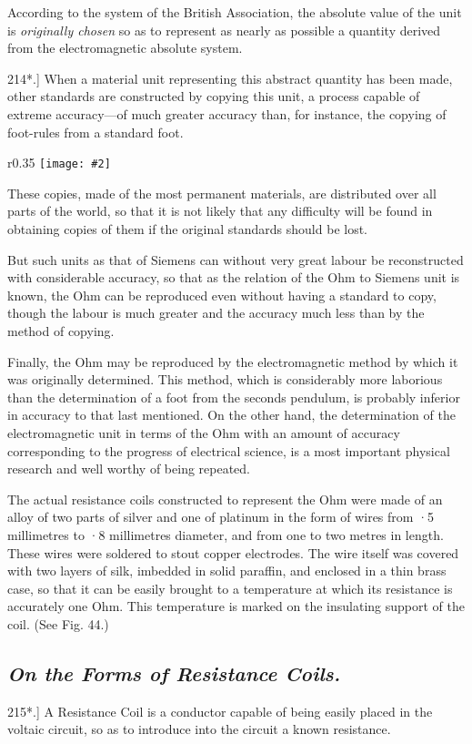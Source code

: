 \documentclass[12pt,oneside]{book}[2021/10/04]
\newcommand{\Heading}{\centering\normalfont}
\newcommand{\Subsection}[1]{\subsection*{\normalsize\Heading\itshape #1}}
\newcommand{\Runhead}[1]{\fancyhead[C]{\iffloatpage{}{\small#1}}}
\newcommand{\article}[1]{\phantomsection \label{art:#1}{#1.]}}
\newcommand{\wrapfig}[3]{
\begin{wrapfigure}{r}{#1\textwidth}
\centering
\texttt{[image: \#2]}
\caption*{\small #3}
\end{wrapfigure}}
\newcommand{\¬}{\hphantom{0}}
\begin{document}
According to the system of the British Association, the absolute
value of the unit is \textit{originally chosen} so as to represent as nearly
as possible a quantity derived from the electromagnetic absolute
system.

\article{214*} When a material unit representing this abstract quantity
has been made, other standards are constructed by copying this unit,
a process capable of extreme accuracy---of much greater accuracy
than, for instance, the copying of foot-rules from a standard foot.
\Runhead{STANDARD RESISTANCE COILS.}

\wrapfig{0.35}{196.png}{Fig. 44.}
These copies, made of the most permanent materials, are distributed
over all parts of the world, so that it is not likely that
any difficulty will be found in obtaining copies of them if the
original standards should be lost.

But such units as that of Siemens can without very great
labour be reconstructed with considerable accuracy, so that as the
relation of the Ohm to Siemens unit is known, the Ohm can be
reproduced even without having a standard to copy, though the
labour is much greater and the accuracy
much less than by the method of copying.

Finally, the Ohm may be reproduced by
the electromagnetic method by which it
was originally determined. This method,
which is considerably more laborious than
the determination of a foot from the seconds
pendulum, is probably inferior in accuracy
to that last mentioned. On the other hand,
the determination of the electromagnetic
unit in terms of the Ohm with an amount
of accuracy corresponding to the progress
of electrical science, is a most important
physical research and well worthy of being
repeated.

The actual resistance coils constructed
to represent the Ohm were made of an
alloy of two parts of silver and one of platinum
in the form of wires from ·5 millimetres
to ·8 millimetres diameter, and from
one to two metres in length. These wires
were soldered to stout copper electrodes. The wire itself was
covered with two layers of silk, imbedded in solid paraffin, and
enclosed in a thin brass case, so that it can be easily brought to
a temperature at which its resistance is accurately one Ohm.
This temperature is marked on the insulating support of the coil.
(See Fig. 44.)

\Subsection{On the Forms of Resistance Coils.}

\article{215*} A Resistance Coil is a conductor capable of being easily
placed in the voltaic circuit, so as to introduce into the circuit
a known resistance.
\end{document}
